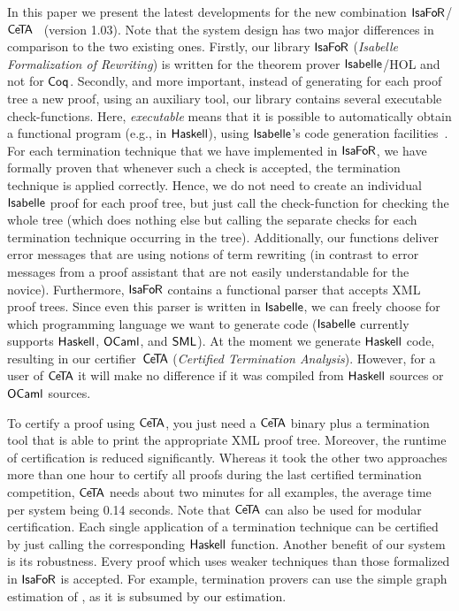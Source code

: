 \documentclass[a4paper,final]{easychair}
\theoremstyle{definition}
\newcommand\formatID[1]{\ensuremath{{\sf#1}}}
\newcommand\CeTA{\formatID{C\kern-0.10exe\kern-0.40exT\kern-0.40exA}}
\newcommand\Coq{\formatID{Coq}}
\newcommand\Haskell{\formatID{Haskell}}
\newcommand\Isabelle{\formatID{Isabelle}}
\newcommand\IsaFoR{\formatID{Isa\kern-0.10exF\kern-0.10exo\kern-0.10exR}}
\newcommand\OCaml{\formatID{OCaml}}
\newcommand\SML{\formatID{SML}}
\begin{document}
In this paper we present the latest developments for the new combination
\IsaFoR/\CeTA~\cite{CeTA} (version 1.03). Note that the system design has two major differences in
comparison to the two existing ones. Firstly, our library \IsaFoR{}
(\emph{Isabelle Formalization of Rewriting}) is written for the theorem prover
\Isabelle/HOL and not for \Coq. Secondly, and more important, instead of
generating for each proof tree a new proof, using an auxiliary tool, our library
contains several executable check-functions. Here, \emph{executable} means
that it is possible to automatically obtain a functional program (e.g., in
\Haskell), using \Isabelle's code generation facilities~\cite{codegen07}. For
each termination technique that we have implemented in \IsaFoR, we have formally
proven that whenever such a check is accepted, the termination technique is
applied correctly. Hence, we do not need to create an individual \Isabelle{}
proof for each proof tree, but just call the \mbox{check-function} for checking the
whole tree (which does nothing else but calling the separate checks for each
termination technique occurring in the tree). Additionally, our functions
deliver error messages that are using notions of term rewriting (in contrast to
error messages from a proof assistant that are not easily understandable for the
novice). Furthermore, \IsaFoR{} contains a functional parser that accepts XML
proof trees. Since even this parser is written in \Isabelle{}, we can freely
choose for which programming language we want to generate code (\Isabelle{}
currently supports \Haskell, \OCaml, and \SML). At the moment we generate
\Haskell{} code, resulting in our certifier~\CeTA{} (\emph{Certified Termination
Analysis}). However, for a user of \CeTA{} it will make no difference if it was
compiled from \Haskell{} sources or \OCaml{} sources. 

To certify a proof using
\CeTA{}, you just need a \CeTA{} binary plus a termination tool that is able to
print the appropriate XML proof tree.  Moreover, the runtime of certification is
reduced significantly.  Whereas it took the other two approaches more than one
hour to certify all proofs during the last certified termination competition,
\CeTA{} needs about two minutes for all examples, the average time per system
being 0.14 seconds.  Note that \CeTA{} can also be used for modular
certification. Each single application of a termination technique can be
certified by just calling the corresponding \Haskell{} function.  Another
benefit of our system is its robustness. Every proof which uses weaker
techniques than those formalized in \IsaFoR{} is accepted. For example,
termination provers can use the simple graph estimation of \cite{AG00}, as it is
subsumed by our estimation. 
\end{document}
